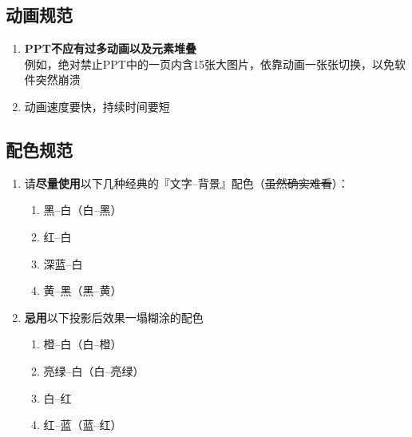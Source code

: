 \subsection[动画规范]{动画规范}
\begin{enumerate}
    \item \textbf{PPT不应有过多动画以及元素堆叠}\\
          例如，绝对禁止PPT中的一页内含15张大图片，依靠动画一张张切换，以免软件突然崩溃
    \item 动画速度要快，持续时间要短
\end{enumerate}

\subsection[配色规范]{配色规范}
\begin{enumerate}
    \item 请\textbf{尽量使用}以下几种经典的『文字--背景』配色（\st{虽然确实难看}）：
          \begin{enumerate}
              \item 黑--白（白--黑）
              \item 红--白
              \item 深蓝--白
              \item 黄--黑（黑--黄）
          \end{enumerate}
    \item \textbf{忌用}以下投影后效果一塌糊涂的配色
          \begin{enumerate}
              \item 橙--白（白--橙）
              \item 亮绿--白（白--亮绿）
              \item 白--红
              \item 红--蓝（蓝--红）
          \end{enumerate}
\end{enumerate}

